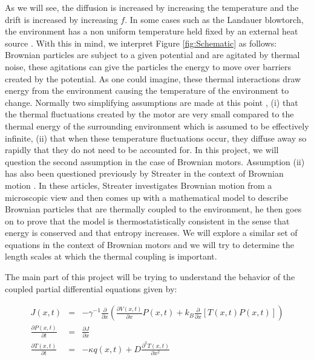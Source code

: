 As we will see, the diffusion is increased by increasing the temperature and the drift is increased by increasing $f$. In some cases such as the Landauer blowtorch, the environment has a non uniform temperature held fixed by an external heat source \cite{Landauer1988}. With this in mind, we interpret Figure \ref{fig:Schematic} as follows: Brownian particles are subject to a given potential and are agitated by thermal noise, these agitations can give the particles the energy to move over barriers created by the potential. As one could imagine, these thermal interactions draw energy from the environment causing the temperature of the environment to change. Normally two simplifying assumptions are made at this point \cite{Reimann2001}, (i) that the thermal fluctuations created by the motor are very small compared to the thermal energy of the surrounding environment which is assumed to be effectively infinite, (ii) that when these temperature fluctuations occur, they diffuse away so rapidly that they do not need to be accounted for. In this project, we will question the second assumption in the case of Brownian motors. Assumption (ii) has also been questioned previously by Streater in the context of Brownian motion \cite{Streater1997, Streater1997a}. In these articles, Streater investigates Brownian motion from a microscopic view and then comes up with a mathematical model to describe Brownian particles that are thermally coupled to the environment, he then goes on to prove that the model is thermostatistically consistent in the sense that energy is conserved and that entropy increases. We will explore a similar set of equations in the context of Brownian motors and we will try to determine the length scales at which the thermal coupling is important.

The main part of this project will be trying to understand the behavior of the coupled partial differential equations given by:

\begin{eqnarray}
J(x, t) &=& -\gamma^{-1} \frac{\partial}{\partial x} \left ( \frac{\partial V(x, t)}{\partial x} P(x, t) + k_B \frac{\partial}{\partial x} \left [T(x, t) P(x, t) \right] \right )  \\
\frac{\partial P(x, t)}{\partial t} &=& \frac{\partial J}{\partial x} \label{eqn:Smoluchowski} \\
\frac{\partial T(x, t)}{\partial t} &=& -\kappa q(x, t) + D \frac{\partial^2 T(x, t)}{\partial x^2} \label{eqn:TemperatureEvolution}
\end{eqnarray}

